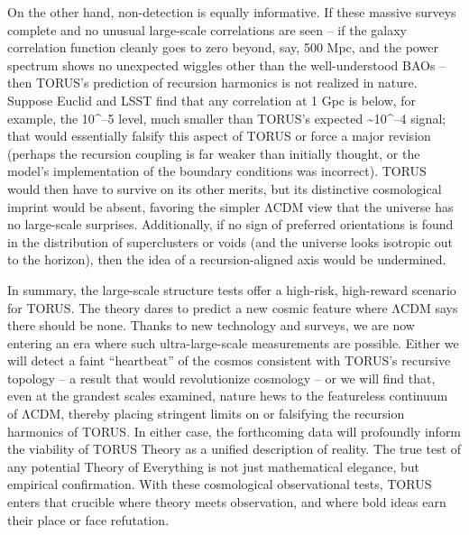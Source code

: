 \documentclass[]{article}
\begin{document}
On the other hand, non-detection is equally informative. If these
massive surveys complete and no unusual large-scale correlations are
seen -- if the galaxy correlation function cleanly goes to zero beyond,
say, 500 Mpc, and the power spectrum shows no unexpected wiggles other
than the well-understood BAOs -- then TORUS's prediction of recursion
harmonics is not realized in nature. Suppose Euclid and LSST find that
any correlation at 1 Gpc is below, for example, the 10\^{}--5 level,
much smaller than TORUS's expected \textasciitilde{}10\^{}--4 signal;
that would essentially falsify this aspect of TORUS or force a major
revision (perhaps the recursion coupling is far weaker than initially
thought, or the model's implementation of the boundary conditions was
incorrect). TORUS would then have to survive on its other merits, but
its distinctive cosmological imprint would be absent, favoring the
simpler ΛCDM view that the universe has no large-scale surprises.
Additionally, if no sign of preferred orientations is found in the
distribution of superclusters or voids (and the universe looks isotropic
out to the horizon), then the idea of a recursion-aligned axis would be
undermined.

In summary, the large-scale structure tests offer a high-risk,
high-reward scenario for TORUS. The theory dares to predict a new cosmic
feature where ΛCDM says there should be none. Thanks to new technology
and surveys, we are now entering an era where such ultra-large-scale
measurements are possible. Either we will detect a faint ``heartbeat''
of the cosmos consistent with TORUS's recursive topology -- a result
that would revolutionize cosmology -- or we will find that, even at the
grandest scales examined, nature hews to the featureless continuum of
ΛCDM, thereby placing stringent limits on or falsifying the recursion
harmonics of TORUS. In either case, the forthcoming data will profoundly
inform the viability of TORUS Theory as a unified description of
reality. The true test of any potential Theory of Everything is not just
mathematical elegance, but empirical confirmation. With these
cosmological observational tests, TORUS enters that crucible where
theory meets observation, and where bold ideas earn their place or face
refutation.
\end{document}
